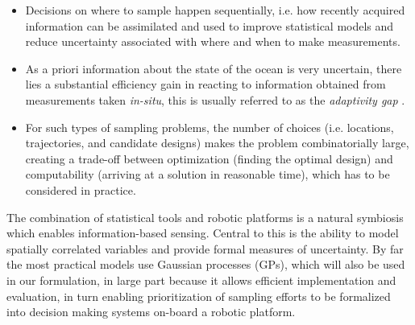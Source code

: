 \documentclass[aoas]{imsart}
\begin{document}
\begin{itemize}
\item Decisions on where to sample happen sequentially, i.e.  how
  recently acquired information can be assimilated and used to improve
  statistical models and reduce uncertainty associated with where and
  when to make measurements.
\item As a priori information about the state of the ocean is very
  uncertain, there lies a substantial efficiency gain in reacting to
  information obtained from measurements taken \emph{in-situ}, this is
  usually referred to as the \emph{adaptivity gap} \citep{Krause2008phd}.
\item For such types of sampling problems, the number of choices (i.e.
  locations, trajectories, and candidate designs) makes the problem
  combinatorially large, creating a trade-off between optimization
  (finding the optimal design) and computability (arriving at a
  solution in reasonable time), which has to be considered in
  practice.
\end{itemize}{}

The combination of statistical tools and robotic platforms is a
natural symbiosis which enables information-based sensing. Central to
this is the ability to model spatially correlated variables and
provide formal measures of uncertainty. By far the most practical
models use Gaussian processes (GPs), which will also be used in our
formulation, in large part because it allows efficient implementation
and evaluation, in turn enabling prioritization of sampling efforts to
be formalized into decision making systems on-board a robotic
platform.


\end{document}

